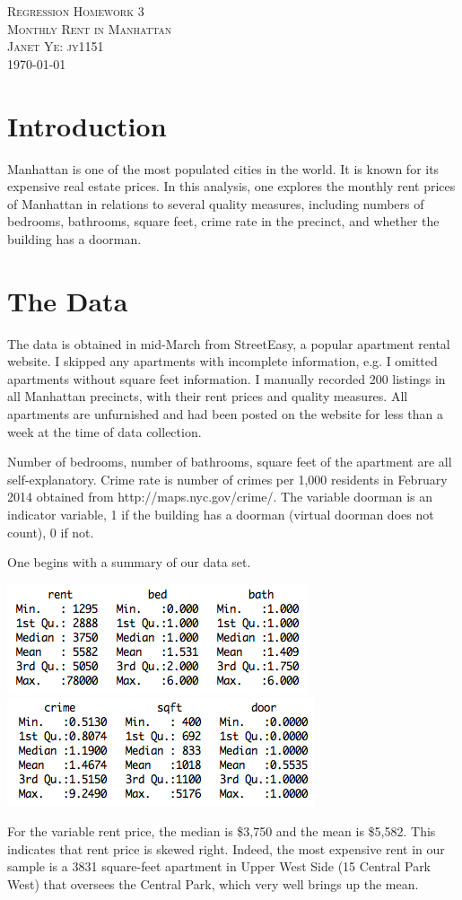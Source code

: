 \documentclass[a4 paper, 11 pt, twocolumn]{article}
\begin{document}
\begin{titlepage}
\begin{center}
\textsc{\huge Regression Homework 3} \\ [0.5cm]
\textsc{\huge Monthly Rent in Manhattan}\\ [1.5cm]
\textsc{\large Janet Ye: jy1151} \\
\vfill
{\large \today}
\end{center}
\end{titlepage}

\section{Introduction}
Manhattan is one of the most populated cities in the world. It is known for its expensive real estate prices. In this analysis, one explores the monthly rent prices of Manhattan in relations to several quality measures, including numbers of bedrooms, bathrooms, square feet, crime rate in the precinct, and whether the building has a doorman.
\section{The Data}
The data is obtained in mid-March from StreetEasy, a popular apartment rental website. I skipped any apartments with incomplete information, e.g. I omitted apartments without square feet information. I manually recorded 200 listings in all Manhattan precincts, with their rent prices and quality measures. All apartments are unfurnished and had been posted on the website for less than a week at the time of data collection.

Number of bedrooms, number of bathrooms, square feet of the apartment are all self-explanatory. Crime rate is number of crimes per 1,000 residents in February 2014 obtained from http://maps.nyc.gov/crime/. The variable doorman is an indicator variable, 1 if the building has a doorman (virtual doorman does not count), 0 if not.

One begins with a summary of our data set.
\begin{center}
\includegraphics[scale=0.7]{sum1}
\includegraphics[scale=0.7]{sum2}
\end{center}
For the variable rent price, the median is \$3,750 and the mean is \$5,582. This indicates that rent price is skewed right. Indeed, the most expensive rent in our sample is a 3831 square-feet apartment in Upper West Side (15 Central Park West) that oversees the Central Park, which very well brings up the mean.
\end{document}
